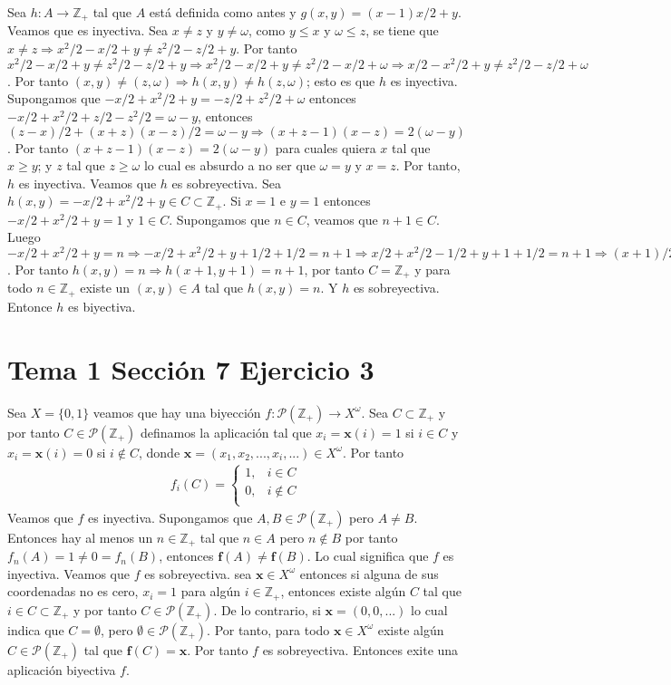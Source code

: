 \documentclass{article}
\newcommand{\vect}[1]{\boldsymbol{#1}}
\begin{document}
Sea $h:A\rightarrow \mathbb{Z}_{+}$ tal que $A$ está definida como antes y $g(x,y)=(x-1)x/2+y$. Veamos que es inyectiva. Sea $x\neq z$ y $y\neq \omega$, como $y\leq x$ y $\omega\leq z$, se tiene que $x\neq z\Rightarrow x^2/2-x/2+y\neq z^2/2-z/2+y$. Por tanto $x^2/2-x/2+y \neq z^2/2-z/2+y \Rightarrow x^2/2-x/2+y\neq z^2/2-x/2+\omega \Rightarrow x/2-x^2/2+y\neq z^2/2-z/2+\omega $. Por tanto $(x,y)\neq (z,\omega)\Rightarrow h(x,y)\neq h(z,\omega)$; esto es que $h$ es inyectiva. Supongamos que $-x/2+x^2/2+y = -z/2+z^2/2+\omega$ entonces $-x/2+x^2/2+z/2 -z^2/2=\omega-y$, entonces $(z-x)/2+(x+z)(x-z)/2=\omega-y\Rightarrow (x+z-1)(x-z)=2(\omega-y)$. Por tanto $(x+z-1)(x-z)=2(\omega-y)$ para cuales quiera $ x$ tal que $x\geq y$; y $z$ tal que $z\geq \omega$ lo cual es absurdo a no ser que $\omega=y$ y $x=z$. Por tanto, $h$ es inyectiva. Veamos que $h$ es sobreyectiva. Sea $h(x,y)=-x/2+x^2/2+y\in C\subset \mathbb{Z}_{+}$. Si $x=1$ e $y=1$ entonces $-x/2+x^2/2+y=1$ y $1\in C$. Supongamos que $n\in C$, veamos que $n+1\in C$. Luego $-x/2+x^2/2+y =n\Rightarrow -x/2+x^2/2+y +1/2 +1/2=n+1\Rightarrow x/2+x^2/2-1/2+y +1 +1/2=n+1 \Rightarrow (x+1)/2+(x-1)(x+1)/2+y+1 =n+1$. Por tanto $h(x,y)=n\Rightarrow h(x+1,y+1)=n+1$, por tanto $C=\mathbb{Z}_{+}$ y para todo $n\in \mathbb{Z}_{+}$ existe un $(x,y)\in A$ tal que $h(x,y)=n$. Y $h$ es sobreyectiva. Entonce $h$ es biyectiva.
\section{Tema 1 Sección 7 Ejercicio 3}
Sea $X=\{0,1\}$ veamos que hay una biyección $f:\mathcal{P}(\mathbb{Z}_{+})\rightarrow X^{\omega}$. Sea $C\subset \mathbb{Z}_{+}$ y por tanto $C\in \mathcal{P}(\mathbb{Z}_{+})$ definamos la aplicación tal que $x_i=\vect{x}(i)=1$ si $i\in C$ y $x_i=\vect{x}(i)=0$ si $i\notin C$, donde $\vect{x}=(x_1,x_2,...,x_i,...)\in X^{\omega}$. Por tanto
\begin{eqnarray}
f_i(C)=
\begin{cases}
1, & i\in C \nonumber\\
0, & i\notin C\nonumber\\
\end{cases}
\end{eqnarray}
Veamos que $f$ es inyectiva. Supongamos que $A,B\in\mathcal{P}(\mathbb{Z}_{+})$ pero $A\neq B$. Entonces hay al menos un $n\in\mathbb{Z}_{+}$ tal que $n\in A$ pero $n\notin B$ por tanto $f_n(A)=1\neq 0=f_n(B)$, entonces $\vect{f}(A)\neq\vect{f}(B)$. Lo cual significa que $f$ es inyectiva.
\newline
Veamos que $f$ es sobreyectiva. sea $\vect{x}\in X^{\omega}$ entonces si alguna de sus coordenadas no es cero, $x_i=1$ para algún $i\in \mathbb{Z}_{+}$, entonces existe algún $C$ tal que $i\in C\subset \mathbb{Z}_{+} $ y por tanto $C\in\mathcal{P}(\mathbb{Z}_{+})$. De lo contrario, si $\vect{x}=(0,0,...)$ lo cual indica que $C=\emptyset$, pero $\emptyset\in\mathcal{P}(\mathbb{Z}_{+})$. Por tanto, para todo $\vect{x}\in X^{\omega}$ existe algún $C\in \mathcal{P}(\mathbb{Z}_{+})$ tal que $\vect{f}(C)=\vect{x}$. Por tanto $f$ es sobreyectiva.
\newline
Entonces exite una aplicación biyectiva $f$.
\end{document}
